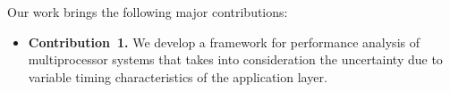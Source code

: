 Our work brings the following major contributions:
\begin{itemize}

\item {\bfseries Contribution~1.} We develop a framework for performance
  analysis of multiprocessor systems that takes into consideration the
  uncertainty due to variable timing characteristics of the application layer.

\end{itemize}

